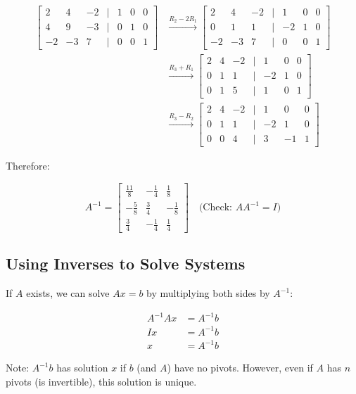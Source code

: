 \documentclass[12pt,a4paper]{article}
\begin{document}
\begin{align*}
\begin{bmatrix}
2 & 4 & -2 & | & 1 & 0 & 0 \\
4 & 9 & -3 & | & 0 & 1 & 0 \\
-2 & -3 & 7 & | & 0 & 0 & 1
\end{bmatrix}
&\xrightarrow{R_2 - 2R_1}
\begin{bmatrix}
2 & 4 & -2 & | & 1 & 0 & 0 \\
0 & 1 & 1 & | & -2 & 1 & 0 \\
-2 & -3 & 7 & | & 0 & 0 & 1
\end{bmatrix} \\
&\xrightarrow{R_3 + R_1}
\begin{bmatrix}
2 & 4 & -2 & | & 1 & 0 & 0 \\
0 & 1 & 1 & | & -2 & 1 & 0 \\
0 & 1 & 5 & | & 1 & 0 & 1
\end{bmatrix} \\
&\xrightarrow{R_3 - R_2}
\begin{bmatrix}
2 & 4 & -2 & | & 1 & 0 & 0 \\
0 & 1 & 1 & | & -2 & 1 & 0 \\
0 & 0 & 4 & | & 3 & -1 & 1
\end{bmatrix}
\end{align*}

Therefore:

\[A^{-1} = \begin{bmatrix} \frac{11}{8} & -\frac{1}{4} & \frac{1}{8} \\ -\frac{5}{8} & \frac{3}{4} & -\frac{1}{8} \\ \frac{3}{4} & -\frac{1}{4} & \frac{1}{4} \end{bmatrix} \quad \text{(Check: $AA^{-1} = I$)}\]

\subsection{Using Inverses to Solve Systems}
If $A$ exists, we can solve $Ax = b$ by multiplying both sides by $A^{-1}$:

\begin{align*}
A^{-1}Ax &= A^{-1}b \\
Ix &= A^{-1}b \\
x &= A^{-1}b
\end{align*}

Note: $A^{-1}b$ has solution $x$ if $b$ (and $A$) have no pivots. However, even if $A$ has $n$ pivots (is invertible), this solution is unique.
\end{document}

